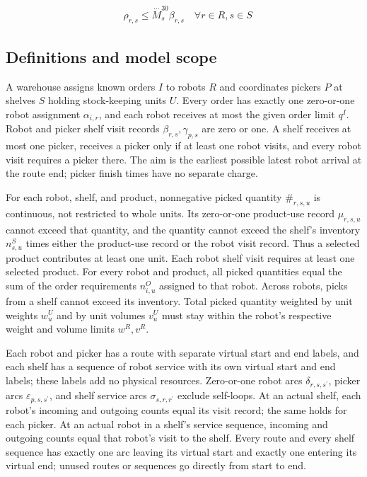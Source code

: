 \documentclass[10pt]{article}
\begin{document}
\[\begin{aligned}& \rho_{r, s} \le \overset{\cdots}{M}^{30}_s \beta_{r, s} \quad \forall r \in R, s \in S\end{aligned}\]

\subsection*{Definitions and model scope}
A warehouse assigns known orders $I$ to robots $R$ and coordinates pickers $P$ at shelves $S$ holding stock-keeping units $U$. Every order has exactly one zero-or-one robot assignment $\alpha_{i,r}$, and each robot receives at most the given order limit $q^I$. Robot and picker shelf visit records $\beta_{r,s},\gamma_{p,s}$ are zero or one. A shelf receives at most one picker, receives a picker only if at least one robot visits, and every robot visit requires a picker there. The aim is the earliest possible latest robot arrival at the route end; picker finish times have no separate charge.

For each robot, shelf, and product, nonnegative picked quantity $\#_{r,s,u}$ is continuous, not restricted to whole units. Its zero-or-one product-use record $\mu_{r,s,u}$ cannot exceed that quantity, and the quantity cannot exceed the shelf's inventory $n^S_{s,u}$ times either the product-use record or the robot visit record. Thus a selected product contributes at least one unit. Each robot shelf visit requires at least one selected product. For every robot and product, all picked quantities equal the sum of the order requirements $n^O_{i,u}$ assigned to that robot. Across robots, picks from a shelf cannot exceed its inventory. Total picked quantity weighted by unit weights $w^U_u$ and by unit volumes $v^U_u$ must stay within the robot's respective weight and volume limits $w^R,v^R$.

Each robot and picker has a route with separate virtual start and end labels, and each shelf has a sequence of robot service with its own virtual start and end labels; these labels add no physical resources. Zero-or-one robot arcs $\delta_{r,s,s^{\prime}}$, picker arcs $\varepsilon_{p,s,s^{\prime}}$, and shelf service arcs $\sigma_{s,r,r^{\prime}}$ exclude self-loops. At an actual shelf, each robot's incoming and outgoing counts equal its visit record; the same holds for each picker. At an actual robot in a shelf's service sequence, incoming and outgoing counts equal that robot's visit to the shelf. Every route and every shelf sequence has exactly one arc leaving its virtual start and exactly one entering its virtual end; unused routes or sequences go directly from start to end.
\end{document}
